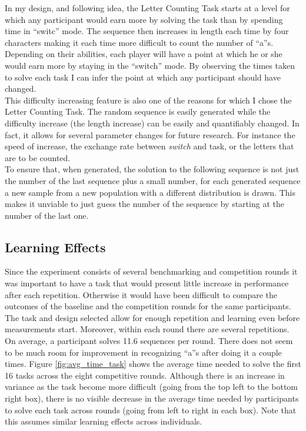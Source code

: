     In my design, and following \cite{sausgruber} idea, the Letter Counting Task starts at a level for which any participant would earn more by solving the task than by spending time in ``switc'' mode. The sequence then increases in length each time by four characters making it each time more difficult to count the number of ``a''s. Depending on their abilities, each player will have a point at which he or she would earn more by staying in the ``switch'' mode. By observing the times taken to solve each task I can infer the point at which any participant should have changed.\\
    
    This difficulty increasing feature is also one of the reasons for which I chose the Letter Counting Task. The random sequence is easily generated while the difficulty increase (the length increase) can be easily and quantifiably changed. In fact, it allows for several parameter changes for future research. For instance the speed of increase, the exchange rate between \textit{switch} and task, or the letters that are to be counted.\\
    
    To ensure that, when generated, the solution to the following sequence is not just the number of the last sequence plus a small number, for each generated sequence a new sample from a new population with a different distribution is drawn. This makes it unviable to just guess the number of the sequence by starting at the number of the last one.
    
        
    \subsection{Learning Effects}
    Since the experiment consists of several benchmarking and competition rounds it was important to have a task that would present little increase in performance after each repetition. Otherwise it would have been difficult to compare the outcomes of the baseline and the competition rounds for the same participants.\\
    
    The task and design selected allow for enough repetition and learning even before measurements start. Moreover, within each round there are several repetitions. On average, a participant solves 11.6 sequences per round. There does not seem to be much room for improvement in recognizing ``a''s after doing it a couple times. Figure \ref{fig:avg_time_task} shows the average time needed to solve the first 16 tasks across the eight competitive rounds. Although there is an increase in variance as the task become more difficult (going from the top left to the bottom right box), there is no visible decrease in the average time needed by participants to solve each task across rounds (going from left to right in each box). Note that this assumes similar learning effects across individuals.
    

